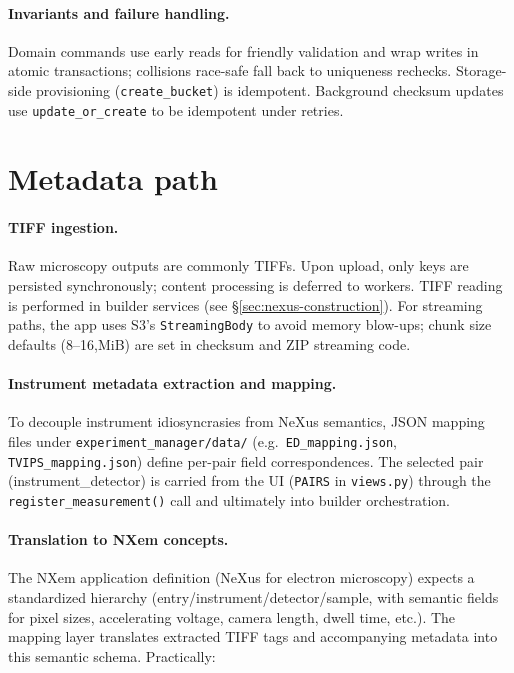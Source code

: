 \paragraph{Invariants and failure handling.}
Domain commands use early reads for friendly validation and wrap writes in atomic transactions; collisions race-safe fall back to uniqueness rechecks. Storage-side provisioning (\texttt{create\_bucket}) is idempotent. Background checksum updates use \texttt{update\_or\_create} to be idempotent under retries.

\section{Metadata path}\label{sec:metadata-path}

\paragraph{TIFF ingestion.}
Raw microscopy outputs are commonly TIFFs. Upon upload, only keys are persisted synchronously; content processing is deferred to workers. TIFF reading is performed in builder services (see \S\ref{sec:nexus-construction}). For streaming paths, the app uses S3’s \texttt{StreamingBody} to avoid memory blow-ups; chunk size defaults (8–16,MiB) are set in checksum and ZIP streaming code.

\paragraph{Instrument metadata extraction and mapping.}
To decouple instrument idiosyncrasies from NeXus semantics, JSON mapping files under \texttt{experiment\_manager/data/} (e.g.\ \texttt{ED\_mapping.json}, \texttt{TVIPS\_mapping.json}) define per-pair field correspondences. The selected pair (instrument\_detector) is carried from the UI (\texttt{PAIRS} in \texttt{views.py}) through the \texttt{register\_measurement()} call and ultimately into builder orchestration.

\paragraph{Translation to NXem concepts.}
The NXem application definition (NeXus for electron microscopy) expects a standardized hierarchy (entry/instrument/detector/sample, with semantic fields for pixel sizes, accelerating voltage, camera length, dwell time, etc.). The mapping layer translates extracted TIFF tags and accompanying metadata into this semantic schema. Practically:

